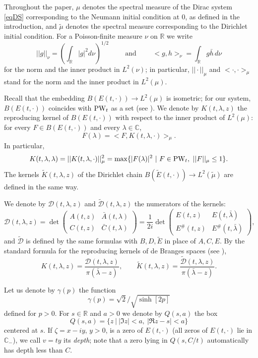 \documentclass[11pt,twoside,reqno]{amsart}
\def\ti{\tilde}
\def\PW{\text{\rm PW}}
\def\to{\rightarrow}
\def\R{{\mathbb R}}
\def\C{{\mathbb{C}}}
\def\l{\lambda}
\def\g{\gamma}
\theoremstyle{plain}
\numberwithin{equation}{section}
\begin{document}
Throughout the paper, $\mu$ denotes the spectral measure of the Dirac system \eqref{eqDS} corresponding to the Neumann initial condition at $0$, as defined in the introduction, and $\ti\mu$ denotes the spectral measure corresponding to the Dirichlet initial condition. For a Poisson-finite measure $\nu$ on $\R$ we write
$$||g||_\nu=\left(\int_\R |g|^2d\nu\right)^{1/2}\qquad\text{ and }\qquad <g,h>_\nu=\int_\R g\bar h\, d\nu$$
for the norm and the inner product in $L^2(\nu)$; in particular, $||\cdot||_\mu$ and $<\cdot,\cdot>_\mu$ stand for the norm and the inner product in $L^2(\mu)$.

Recall that the embedding $B(E(t,\cdot))\to L^2(\mu)$ is isometric; for our system, $B(E(t,\cdot))$ coincides with $\PW_t$ as a set (see \cite{Den}). We denote by $K(t,\l,z)$ the reproducing kernel of $B(E(t,\cdot))$ with respect to the inner product of $L^2(\mu)$: for every $F\in B(E(t,\cdot))$ and every $\l\in\C$,
$$F(\l)=<F,K(t,\l,\cdot)>_\mu.$$
In particular,
$$K(t,\l,\l)=||K(t,\l,\cdot)||^2_\mu=\max\{|F(\l)|^2\ |\ F\in\PW_t,\ ||F||_\mu\leq 1\}.$$
The kernels $\ti K(t,\l,z)$ of the Dirichlet chain $B(\ti E(t,\cdot))\to L^2(\ti\mu)$ are defined in the same way.

We denote by ${\mathcal D}(t,\l,z)$ and $\ti{\mathcal D}(t,\l,z)$ the numerators of the kernels:
\begin{equation}
	{\mathcal D}(t,\l,z)=\det\begin{pmatrix}A(t,z) & \bar A(t,\l) \\ C(t,z) & \bar C (t,\l)
	\end{pmatrix}=\frac 1{2i}\det\begin{pmatrix}E(t,z) & E(t,\bar \l) \\ E^\#(t,z) & E^\# (t,\bar \l)
	\end{pmatrix},\label{eq1004M}\end{equation}
and $\ti{\mathcal D}$ is defined by the same formulas with $B,D,\ti E$ in place of $A,C,E$. By the standard formula for the reproducing kernels of de Branges spaces (see \cite{dBr}),
\begin{equation}
K(t,\l,z)=\frac{{\mathcal D}(t,\l,z)}{\pi(\bar\l-z)},\qquad
\ti K(t,\l,z)=\frac{\ti{\mathcal D}(t,\l,z)}{\pi(\bar\l-z)} .
\label{eqKD}
\end{equation}

Let us denote by $\g(p)$ the function $$\g(p)=\sqrt{2}/\sqrt{\sinh [2p]}$$
defined for $p> 0$. For $s\in\R$ and $a>0$ we denote by $Q(s,a)$ the box
$$Q(s,a)=\{z\ |\ |\Im z|<a,\ |\Re z-s|<a\}$$
centered at $s$. If $\zeta=x-iy$, $y>0$, is a zero of $E(t,\cdot)$ (all zeros of $E(t,\cdot)$ lie in $\C_-$), we call $v=ty$ its {\it depth}; note that a zero lying in $Q(s,C/t)$ automatically has depth less than $C$.
\end{document}

